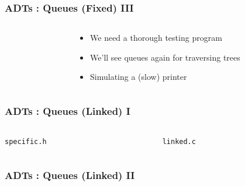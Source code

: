 
\begin{frame}[fragile]
\frametitle{ADTs : Queues (Fixed) III}
\begin{columns}[T]

\begin{column}{0.45\textwidth}

\end{column}

\pause
\begin{column}{0.30\textwidth}
\begin{itemize}
\item We need a thorough testing program
\item We'll see queues again for traversing trees
\item Simulating a (slow) printer
\end{itemize}
\end{column}

\end{columns}
\end{frame}


\begin{frame}[fragile]
\frametitle{ADTs : Queues (Linked) I}
\begin{columns}[T]

\begin{column}{0.45\textwidth}
\verb^specific.h^

\end{column}

\pause
\begin{column}{0.45\textwidth}
\verb^linked.c^

\end{column}

\end{columns}
\end{frame}


\begin{frame}[fragile]
\frametitle{ADTs : Queues (Linked) II}
\begin{columns}[T]

\begin{column}{0.45\textwidth}

\end{column}

\pause
\begin{column}{0.45\textwidth}

\end{column}

\end{columns}
\end{frame}

